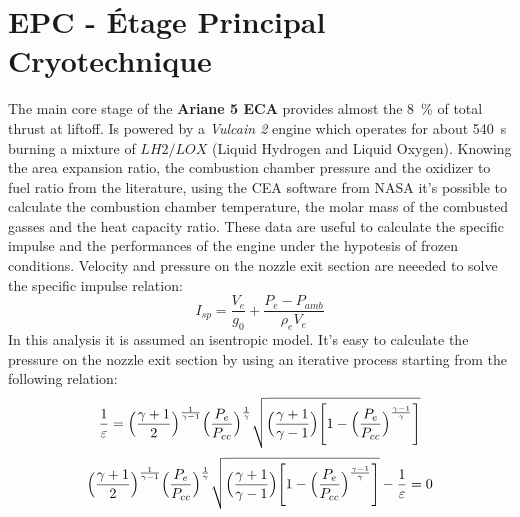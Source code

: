 \documentclass[12pt,fleqn,openany]{book} %
\begin{document}
\section{EPC - Étage Principal Cryotechnique}
The main core stage of the \textbf{Ariane 5 ECA} provides almost the \SI{8}{\%} of total thrust at liftoff. Is powered by a \textit{Vulcain 2} engine which operates for about \SI{540}{s} burning a mixture of $LH2/LOX$ (Liquid Hydrogen and Liquid Oxygen). Knowing the area expansion ratio, the combustion chamber pressure and the oxidizer to fuel ratio from the literature, using the CEA software from NASA it's possible to calculate the combustion chamber temperature, the molar mass of the combusted gasses and the heat capacity ratio. These data are useful to calculate the specific impulse and the performances of the engine under the hypotesis of frozen conditions.
Velocity and pressure on the nozzle exit section are neeeded to solve the specific impulse relation:
\begin{equation}
 I_{sp}=\frac{V_e}{g_0}+\frac{P_e-P_{amb}}{\rho_eV_e}
\end{equation}
\noindent In this analysis it is assumed an isentropic model. It's easy to calculate the pressure on the nozzle exit section by using an iterative process starting from the following relation:
\begin{equation}
  \frac{1}{\varepsilon}=\Bigl(\frac{\gamma+1}{2}\Bigr)^{\frac{1}{\gamma-1}}\Bigl(\frac{P_e}{P_{cc}}\Bigr)^{\frac{1}{\gamma}}\sqrt{\Bigl(\frac{\gamma+1}{\gamma-1}\Bigr)\Biggl[1-\Bigl(\frac{P_e}{P_{cc}}\Bigr)^{\frac{\gamma-1}{\gamma}}\Biggr]}              
\end{equation}
\begin{equation}
  \Bigl(\frac{\gamma+1}{2}\Bigr)^{\frac{1}{\gamma-1}}\Bigl(\frac{P_e}{P_{cc}}\Bigr)^{\frac{1}{\gamma}}\sqrt{\Bigl(\frac{\gamma+1}{\gamma-1}\Bigr)\Biggl[1-\Bigl(\frac{P_e}{P_{cc}}\Bigr)^{\frac{\gamma-1}{\gamma}}\Biggr]}-\frac{1}{\varepsilon}=0              
\end{equation}
\end{document}
